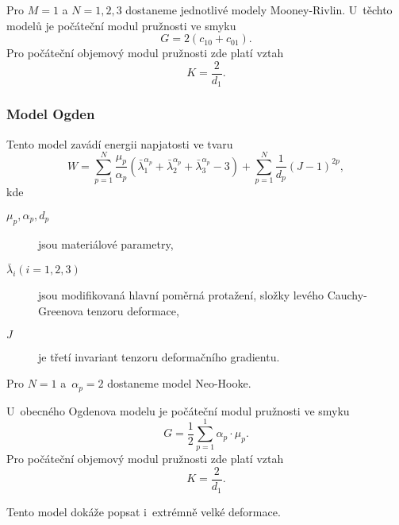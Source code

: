 Pro $M=1$ a $N= 1,2,3$ dostaneme jednotlivé modely Mooney-Rivlin.
U~těchto modelů je počáteční modul pružnosti ve smyku
\begin{equation}
	G = 2 \left(c_{10} + c_{01}\right).
\end{equation}
Pro počáteční objemový modul pružnosti zde platí vztah
\begin{equation}
	K = \frac{2}{d_1}.
\end{equation}

\subsubsection{Model Ogden}\label{sec:model-ogden}
Tento model zavádí energii napjatosti ve tvaru
\begin{equation}
	W
	= \sum\limits_{p=1}^N \frac{\mu_p}{\alpha_p} \left( \bar{\lambda}_1^{\alpha_p} + \bar{\lambda}_2^{\alpha_p} + \bar{\lambda}_3^{\alpha_p} - 3\right)
	+ \sum\limits_{p=1}^N \frac{1}{d_p} \left(J - 1\right)^{2p},
\end{equation}
kde
\begin{description}
	\item[$\mu_p, \alpha_p, d_p$] jsou materiálové parametry,
	\item[$\bar{\lambda}_i (i=1,2,3)$] jsou modifikovaná hlavní poměrná protažení, složky levého Cauchy-Greenova tenzoru deformace,
	\item[$J$] je třetí invariant tenzoru deformačního gradientu.
\end{description}

Pro $N = 1$ a~$\alpha_p = 2$ dostaneme model Neo-Hooke.

U~obecného Ogdenova modelu je počáteční modul pružnosti ve smyku
\begin{equation}
	G = \frac{1}{2} \sum\limits_{p=1}^1 \alpha_p \cdot \mu_p.
\end{equation}
Pro počáteční objemový modul pružnosti zde platí vztah
\begin{equation}
	K = \frac{2}{d_1}.
\end{equation}

Tento model dokáže popsat i~extrémně velké deformace.

